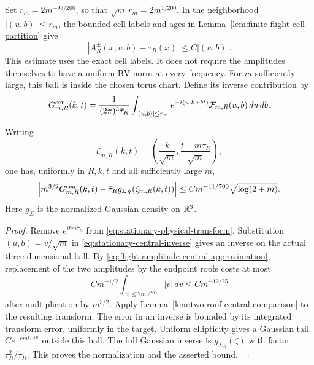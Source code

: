 Set $r_m=2m^{-99/200}$, so that $\sqrt m\,r_m=2m^{1/200}$.
In the neighborhood $|(u,b)|\le r_m$, the bounded cell labels and ages
in Lemma~\ref{lem:finite-flight-cell-partition} give
\begin{equation}\label{eq:flight-amplitude-central-approximation}
 |A_R^\pm(x;u,b)-\tau_R(x)|\le C|(u,b)|.
\end{equation}
This estimate uses the exact cell labels. It does not require the
amplitudes themselves to have a uniform BV norm at every frequency.
For $m$ sufficiently large, this ball is inside the chosen torus chart.
Define its inverse contribution by
\begin{equation}\label{eq:stationary-central-inverse}
 G^{\rm cen}_{m,R}(k,t)=\frac1{(2\pi)^3\bar\tau_R}
 \int_{|(u,b)|\le r_m}
    e^{-i(u\cdot k+bt)}\mathcal F_{m,R}(u,b)\,du\,db.
\end{equation}

\begin{theorem}
\label{thm:stationary-singleton-central-term}
Writing
\[
 \zeta_{m,R}(k,t)=\left(\frac{k}{\sqrt m},
                             \frac{t-m\bar\tau_R}{\sqrt m}\right),
\]
one has, uniformly in $R,k,t$ and all sufficiently large $m$,
\begin{equation}\label{eq:stationary-singleton-central-term}
 \left|m^{3/2}G^{\rm cen}_{m,R}(k,t)
             -\bar\tau_R g_{\Sigma_R}(\zeta_{m,R}(k,t))\right|
                \le C m^{-11/700}\sqrt{\log(2+m)}.
\end{equation}
Here $g_{\Sigma}$ is the normalized Gaussian density on $\mathbb R^3$.
\end{theorem}
\begin{proof}
Remove $e^{ibm\bar\tau_R}$ from
\eqref{eq:stationary-physical-transform}. Substitution
$(u,b)=v/\sqrt m$ in \eqref{eq:stationary-central-inverse} gives
an inverse on the actual three-dimensional ball. By
\eqref{eq:flight-amplitude-central-approximation}, replacement of
the two amplitudes by the endpoint roofs costs at most
\[
 C m^{-1/2}\int_{|v|\le2m^{1/200}}|v|\,dv
                         \le C m^{-12/25}
\]
after multiplication by $m^{3/2}$. Apply
Lemma~\ref{lem:two-roof-central-comparison} to the resulting transform.
The error in an inverse is bounded by its integrated transform error,
uniformly in the target. Uniform ellipticity gives a Gaussian tail
$Ce^{-c m^{1/100}}$ outside this ball. The full Gaussian inverse is
$g_{\Sigma_R}(\zeta)$ with factor $\bar\tau_R^2/\bar\tau_R$.
This proves the normalization and the asserted bound.
\end{proof}

